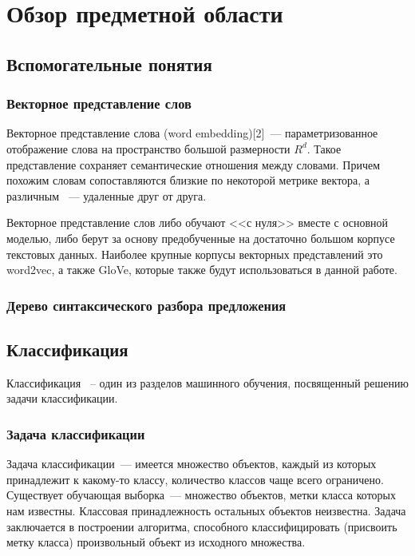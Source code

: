
\chapter{Обзор предметной области}

\section{Вспомогательные понятия}

\subsection{Векторное представление слов}
Векторное представление слова (word embedding)[2]~--- параметризованное отображение слова на пространство большой размерности $R^d$. Такое представление сохраняет семантические отношения между словами. Причем похожим словам сопоставляются близкие по некоторой метрике вектора, а различным ~--- удаленные друг от друга.

Векторное представление слов либо обучают <<с нуля>> вместе с основной моделью, либо берут за основу предобученные на достаточно большом корпусе текстовых данных. Наиболее крупные корпусы векторных представлений это word2vec, а также GloVe, которые также будут использоваться в данной работе.


\subsection{Дерево синтаксического разбора предложения}

\section{Классификация}

Классификация ~-- один из разделов машинного обучения, посвященный решению
задачи классификации.

\subsection{Задача классификации}

Задача классификации~--- имеется множество объектов, каждый из которых принадлежит
к какому-то классу, количество классов чаще всего ограничено.
Существует обучающая выборка~--- множество объектов, метки
класса которых нам известны. Классовая принадлежность остальных объектов
неизвестна. Задача заключается в построении алгоритма, способного
классифицировать (присвоить метку класса) произвольный объект из исходного множества.


